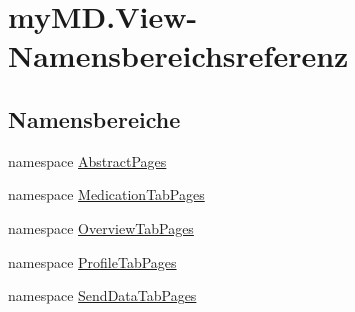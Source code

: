 \hypertarget{namespacemy_m_d_1_1_view}{}\section{my\+M\+D.\+View-\/\+Namensbereichsreferenz}
\label{namespacemy_m_d_1_1_view}
\subsection*{Namensbereiche}
\begin{DoxyCompactItemize}
\item 
namespace \mbox{\hyperlink{namespacemy_m_d_1_1_view_1_1_abstract_pages}{Abstract\+Pages}}
\item 
namespace \mbox{\hyperlink{namespacemy_m_d_1_1_view_1_1_medication_tab_pages}{Medication\+Tab\+Pages}}
\item 
namespace \mbox{\hyperlink{namespacemy_m_d_1_1_view_1_1_overview_tab_pages}{Overview\+Tab\+Pages}}
\item 
namespace \mbox{\hyperlink{namespacemy_m_d_1_1_view_1_1_profile_tab_pages}{Profile\+Tab\+Pages}}
\item 
namespace \mbox{\hyperlink{namespacemy_m_d_1_1_view_1_1_send_data_tab_pages}{Send\+Data\+Tab\+Pages}}
\end{DoxyCompactItemize}
